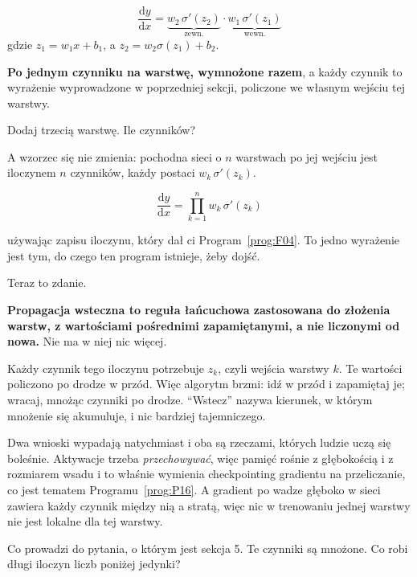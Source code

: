 \begin{fr}
\begin{ansblock}
\[ \frac{\mathrm{d}y}{\mathrm{d}x}
   = \underbrace{w_2\,\sigma'(z_2)}_{\text{zewn.}} \cdot
     \underbrace{w_1\,\sigma'(z_1)}_{\text{wewn.}} \]
gdzie $z_1 = w_1x + b_1$, a $z_2 = w_2\sigma(z_1) + b_2$.
\end{ansblock}

\textbf{Po jednym czynniku na warstwę, wymnożone razem}, a każdy czynnik to
wyrażenie wyprowadzone w poprzedniej sekcji, policzone we własnym wejściu tej
warstwy.

Dodaj trzecią warstwę. Ile czynników?
\nextframe
\end{fr}

\begin{fr}
A wzorzec się nie zmienia: pochodna sieci o $n$ warstwach po jej wejściu jest
iloczynem $n$ czynników, każdy postaci $w_k\,\sigma'(z_k)$.

\[ \frac{\mathrm{d}y}{\mathrm{d}x}
   = \prod_{k=1}^{n} w_k\,\sigma'(z_k) \]

używając zapisu iloczynu, który dał ci Program~\ref{prog:F04}. To jedno
wyrażenie jest tym, do czego ten program istnieje, żeby dojść.

\end{fr}

\begin{fr}
Teraz to zdanie.

\begin{aibox}
\textbf{Propagacja wsteczna%
 to reguła łańcuchowa zastosowana do
złożenia warstw, z wartościami pośrednimi zapamiętanymi, a nie liczonymi od
nowa.} Nie ma w niej nic więcej.

Każdy czynnik tego iloczynu potrzebuje $z_k$, czyli wejścia warstwy $k$. Te
wartości policzono po drodze w przód. Więc algorytm brzmi: idź w przód i
zapamiętaj je; wracaj, mnożąc czynniki po drodze. \enquote{Wstecz} nazywa
kierunek, w którym mnożenie się akumuluje, i nic bardziej tajemniczego.

Dwa wnioski wypadają natychmiast i oba są rzeczami, których ludzie uczą się
boleśnie. Aktywacje trzeba \emph{przechowywać}, więc pamięć rośnie z
głębokością i z rozmiarem wsadu \dash{} i to właśnie wymienia checkpointing
gradientu na przeliczanie, co jest tematem Programu~\ref{prog:P16}. A gradient
po wadze głęboko w sieci zawiera każdy czynnik między nią a stratą, więc nic w
trenowaniu jednej warstwy nie jest lokalne dla tej warstwy.
\end{aibox}

Co prowadzi do pytania, o którym jest sekcja 5. Te czynniki są mnożone. Co
robi długi iloczyn liczb poniżej jedynki?
\nextframe
\end{fr}

